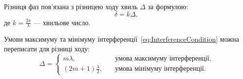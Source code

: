 %
%
%
%
%

Різниця фаз пов'язана з різницею ходу хвиль $ \Delta $ за формулою:
\begin{equation}\label{}
    \delta = k \Delta,
\end{equation}
де $ k = \frac{2\pi}{\lambda} $ --- хвильове число.

Умови максимуму та мінімуму інтерференції~\eqref{eq:InterferenceCondition} можна переписати для  різниці ходу:
\begin{equation}\label{eq:InterferenceConditionDelta}
	\Delta=
	\begin{cases}
		m \lambda,                 & \quad \text{умова максимуму інтерференції}, \\
		(2m + 1)\frac{\lambda}{2}, & \quad\text{умова мінімуму інтерференції}.
	\end{cases}
\end{equation}



